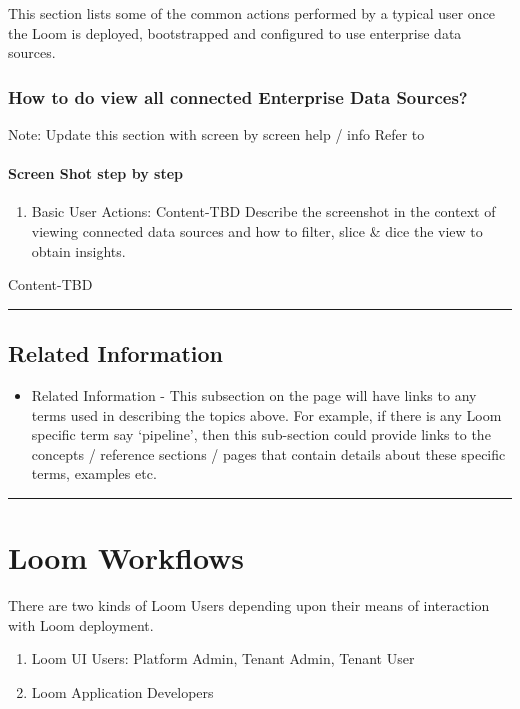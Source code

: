 \documentclass[letterpaper,10pt,english]{sphinxmanual}
\begin{document}
This section lists some of the common actions performed by a typical user once the Loom is deployed, bootstrapped and configured to use enterprise data sources.


\subsubsection{How to do view all connected Enterprise Data Sources?}
\label{\detokenize{loom_getting_started_guide:how-to-do-view-all-connected-enterprise-data-sources}}
Note:  Update this section with screen by screen help / info
Refer to 


\paragraph{Screen Shot step by step}
\label{\detokenize{loom_getting_started_guide:screen-shot-step-by-step}}\begin{enumerate}
\item {} 
Basic User Actions: Content-TBD  Describe the screenshot in the context of viewing connected data sources and how to filter, slice \& dice the view to obtain insights.

\end{enumerate}

Content-TBD


\bigskip\hrule\bigskip



\subsection{Related Information}
\label{\detokenize{loom_getting_started_guide:related-information}}\begin{itemize}
\item {} 
Related Information - This subsection on the page will have links to any terms used in describing the topics above. For example, if there is any Loom specific term say ‘pipeline’, then this sub-section could provide links to the concepts / reference sections / pages that contain details about these specific terms, examples etc.

\end{itemize}


\bigskip\hrule\bigskip



\section{Loom Workflows}
\label{\detokenize{loom_getting_started_guide:content-loom-usage-wf}}\label{\detokenize{loom_getting_started_guide:loom-workflows}}
There are two kinds of Loom Users depending upon their means of interaction with Loom deployment.
\begin{enumerate}
\item {} 
Loom UI Users:  Platform Admin, Tenant Admin, Tenant User

\item {} 
Loom Application Developers

\end{enumerate}
\end{document}
